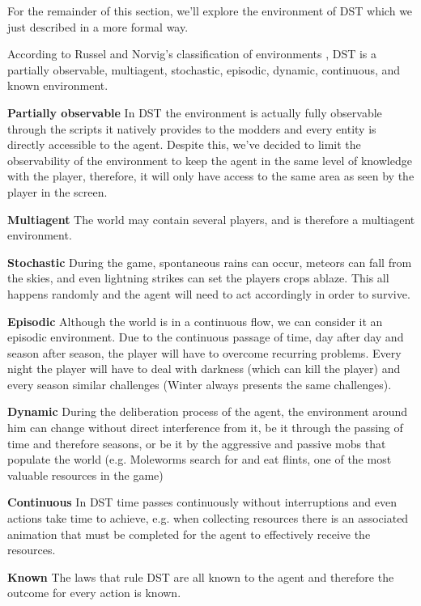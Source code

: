 For the remainder of this section, we'll explore the environment of \ac{DST} which we just described in a more formal way.

According to Russel and Norvig's classification of environments \cite{russell&norvig:aima}, \ac{DST} is a partially observable, multiagent, stochastic, episodic, dynamic, continuous, and known environment.

\begin{description}
	\item \textbf{Partially observable} In \ac{DST} the environment is actually fully observable through the scripts it natively provides to the modders and every entity is directly accessible to the agent. Despite this, we've decided to limit the observability of the environment to keep the agent in the same level of knowledge with the player, therefore, it will only have access to the same area as seen by the player in the screen.
	\item \textbf{Multiagent} The world may contain several players, and is therefore a multiagent environment.
	\item \textbf{Stochastic} During the game, spontaneous rains can occur, meteors can fall from the skies, and even lightning strikes can set the players crops ablaze. 
	This all happens randomly and the agent will need to act accordingly in order to survive.
	\item \textbf{Episodic} Although the world is in a continuous flow, we can consider it an episodic environment. 
	Due to the continuous passage of time, day after day and season after season, the player will have to overcome recurring problems.
    Every night the player will have to deal with darkness (which can kill the player) and every season similar challenges (Winter always presents the same challenges).
	\item \textbf{Dynamic} During the deliberation process of the agent, the environment around him can change without direct interference from it, be it through the passing of time and therefore seasons, or be it by the aggressive and passive mobs that populate the world (e.g. Moleworms search for and eat flints, one of the most valuable resources in the game)
	\item \textbf{Continuous} In \ac{DST} time passes continuously without interruptions and even actions take time to achieve, e.g. when collecting resources there is an associated animation that must be completed for the agent to effectively receive the resources.
	\item \textbf{Known} The laws that rule \ac{DST} are all known to the agent and therefore the outcome for every action is known.
\end{description}

